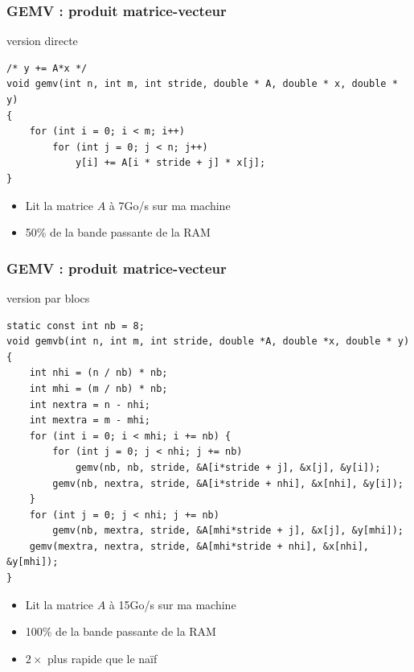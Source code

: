 \documentclass[xcolor={x11names,svgnames}]{beamer}
\begin{document}
\begin{frame}[fragile=singleslide]
  \frametitle{GEMV : produit matrice-vecteur}

  \begin{block}{version directe}
\begin{verbatim}
/* y += A*x */
void gemv(int n, int m, int stride, double * A, double * x, double * y)
{
    for (int i = 0; i < m; i++)
        for (int j = 0; j < n; j++)
            y[i] += A[i * stride + j] * x[j];
}
\end{verbatim}
    \begin{itemize}
    \item Lit la matrice $A$ à 7Go/s sur ma machine
    \item 50\% de la bande passante de la RAM
    \end{itemize}
  \end{block}
\end{frame}


\begin{frame}[fragile=singleslide]
  \frametitle{GEMV : produit matrice-vecteur}

\begin{alertblock}{version par blocs}
\begin{verbatim}
static const int nb = 8;
void gemvb(int n, int m, int stride, double *A, double *x, double * y)
{
    int nhi = (n / nb) * nb;
    int mhi = (m / nb) * nb;
    int nextra = n - nhi;
    int mextra = m - mhi;
    for (int i = 0; i < mhi; i += nb) {
        for (int j = 0; j < nhi; j += nb)
            gemv(nb, nb, stride, &A[i*stride + j], &x[j], &y[i]);
        gemv(nb, nextra, stride, &A[i*stride + nhi], &x[nhi], &y[i]);
    }
    for (int j = 0; j < nhi; j += nb)
        gemv(nb, mextra, stride, &A[mhi*stride + j], &x[j], &y[mhi]);
    gemv(mextra, nextra, stride, &A[mhi*stride + nhi], &x[nhi], &y[mhi]);
}
\end{verbatim}
    \begin{itemize}
    \item Lit la matrice $A$ à 15Go/s sur ma machine
    \item 100\% de la bande passante de la RAM
    \item $2\times$ plus rapide que le naïf
    \end{itemize}

\end{alertblock}
\end{frame}
\end{document}
